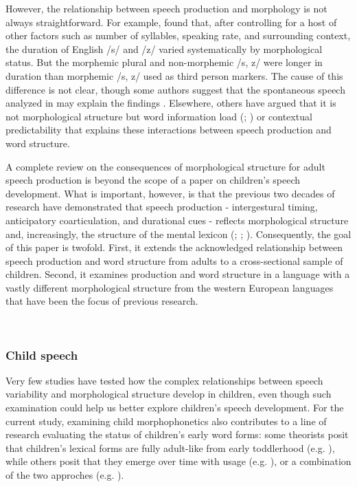 \documentclass[a4paper,man,floatsintext,natbib,donotrepeattitle, apacite]{apa6}
\begin{document}
However, the relationship between speech production and morphology is not always straightforward. For example, \citet{plagHomophonyMorphologyAcoustics2017} found that, after controlling for a host of other factors such as number of syllables, speaking rate, and surrounding context, the duration of English /s/ and /z/ varied systematically by morphological status. But the morphemic plural and non-morphemic /s, z/ were longer in duration than morphemic /s, z/ used as third person markers. The cause of this difference is not clear, though some authors suggest that the spontaneous speech analyzed in \citet{plagHomophonyMorphologyAcoustics2017} may explain the findings \citep{seyfarthAcousticDifferencesMorphologicallydistinct2018}. Elsewhere, others have argued that it is not morphological structure but word information load (\citealt{haniqueRoleMorphologyAcoustic2012}; \citealt{pluymaekersMorphologicalEffectsFine2010}) or contextual predictability \citep{cohenProbabilisticReductionProbabilistic2014} that explains these interactions between speech production and word structure. 

A complete  review on the consequences of morphological structure for adult speech production is beyond the scope of a paper on children's speech development. What is important, however, is that the previous two decades of research have demonstrated that speech production - intergestural timing, anticipatory coarticulation, and durational cues -  reflects morphological structure and, increasingly, the structure of the mental lexicon (\citealt{kempsProsodicCuesMorphological2005}; \citealt{plagPhonologicalPhoneticVariability2014}; \citealt{tomaschekHowAnticipatoryCoarticulation2019}). Consequently, the goal of this paper is twofold. First, it extends the acknowledged relationship between speech production and word structure from adults to a cross-sectional sample of children. Second, it examines production and word structure in a language with a vastly different morphological structure from the western European languages that have been the focus of previous research.   

~
~

\subsubsection{Child speech}\label{child-morph}

Very few studies have tested how the complex relationships between speech variability and morphological structure develop in children, even though such examination could help us better explore children’s speech development. For the current study, examining child morphophonetics also contributes to a line of research evaluating the status of children's early word forms:  some theorists posit that children's lexical forms are fully adult-like from early toddlerhood (e.g. \citealt{wexlerVeryEarlyParameter1998}), while others posit that they emerge over time with usage (e.g. \citealt{ambridgeUbiquityFrequencyEffects2015}), or a combination of the two approches (e.g. \citealt{swingleyLexicalNeighborhoodsWordForm2002}). 
\end{document}

